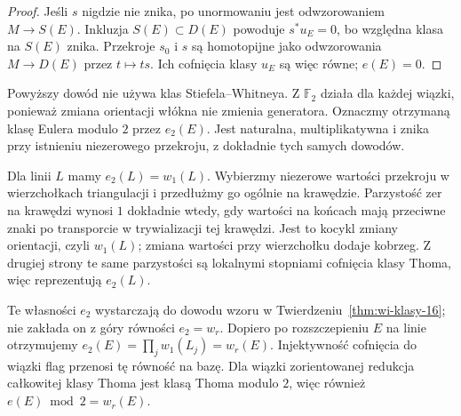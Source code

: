 \begin{proof}
Jeśli $s$ nigdzie
nie znika, po unormowaniu
jest odwzorowaniem
$M\to S(E)$.
Inkluzja $S(E)\subset D(E)$
powoduje $s^*u_E=0$,
bo względna klasa
na $S(E)$ znika.
Przekroje $s_0$ i $s$
są homotopijne jako
odwzorowania $M\to D(E)$
przez $t\mapsto ts$.
Ich cofnięcia klasy
$u_E$ są więc równe;
$e(E)=0$.
\end{proof}

\begin{uwaga}
Powyższy dowód nie używa klas Stiefela--Whitneya.
Z $\mathbb F_2$ działa dla każdej wiązki, ponieważ
zmiana orientacji włókna nie zmienia generatora.
Oznaczmy otrzymaną klasę Eulera modulo $2$ przez $e_2(E)$.
Jest naturalna, multiplikatywna i znika przy istnieniu
niezerowego przekroju, z dokładnie tych samych dowodów.

Dla linii $L$ mamy $e_2(L)=w_1(L)$. Wybierzmy
niezerowe wartości przekroju w wierzchołkach triangulacji
i przedłużmy go ogólnie na krawędzie. Parzystość zer
na krawędzi wynosi $1$ dokładnie wtedy, gdy wartości
na końcach mają przeciwne znaki po transporcie
w trywializacji tej krawędzi. Jest to kocykl zmiany
orientacji, czyli $w_1(L)$; zmiana wartości przy
wierzchołku dodaje kobrzeg. Z drugiej strony te same
parzystości są lokalnymi stopniami cofnięcia klasy Thoma,
więc reprezentują $e_2(L)$.

Te własności $e_2$ wystarczają do dowodu wzoru
w Twierdzeniu~\ref{thm:wi-klasy-16}; nie zakłada on
z góry równości $e_2=w_r$. Dopiero po rozszczepieniu
$E$ na linie otrzymujemy
$e_2(E)=\prod_jw_1(L_j)=w_r(E)$.
Injektywność cofnięcia do wiązki flag przenosi
tę równość na bazę. Dla wiązki zorientowanej
redukcja całkowitej klasy Thoma jest klasą Thoma modulo $2$,
więc również $e(E)\bmod2=w_r(E)$.
\end{uwaga}


